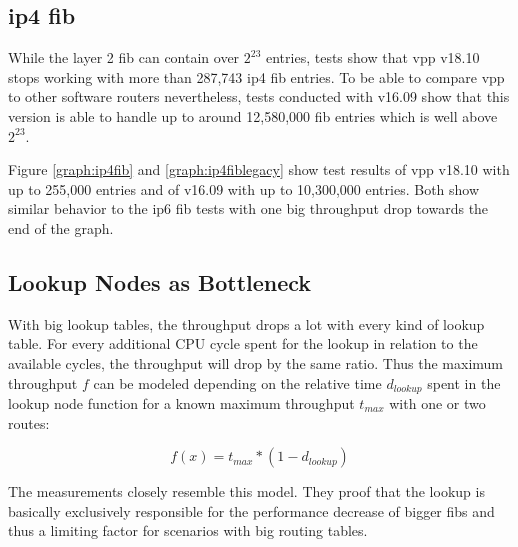 \subsection{\Ac{ip4} \Ac{fib}}
\label{sec:ip4fib}

While the layer 2 \Ac{fib} can contain over $2^{23}$ entries, tests
show that \Ac{vpp} v18.10 stops working with more than 287,743
\Ac{ip4} \Ac{fib} entries. To be able to compare \Ac{vpp} to other
software routers nevertheless, tests conducted with v16.09 show that
this version is able to handle up to around 12,580,000 \Ac{fib}
entries which is well above $2^{23}$.

Figure \ref{graph:ip4fib} and \ref{graph:ip4fiblegacy} show test
results of \Ac{vpp} v18.10 with up to 255,000 entries and of v16.09
with up to 10,300,000 entries. Both show similar behavior to the
\Ac{ip6} \Ac{fib} tests with one big throughput drop towards the end
of the graph.


\subsection{Lookup Nodes as Bottleneck}

With big lookup tables, the throughput drops a lot with every kind of
lookup table. For every additional CPU cycle spent for the
lookup in relation to the available cycles, the throughput will drop
by the same ratio. Thus the maximum throughput $f$ can be modeled
depending on the relative time $d_{lookup}$ spent in the lookup node
function for a known maximum throughput $t_{max}$ with one or two
routes:

$$ f(x) = t_{max} * ( 1 - d_{lookup} ) $$

The measurements closely resemble this model. They proof that the
lookup is basically exclusively responsible for the performance
decrease of bigger \Ac{fib}s and thus a limiting factor for scenarios with
big routing tables.

